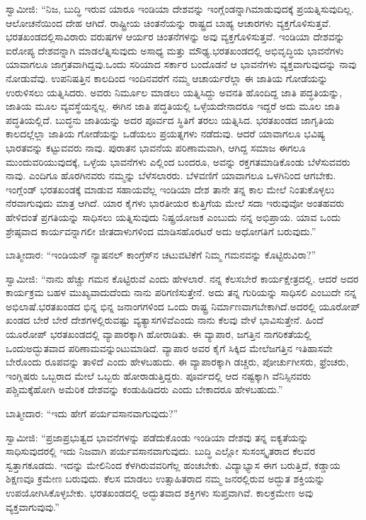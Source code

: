 ಸ್ವಾಮೀಜಿ: “ನಿಜ, ಬುದ್ಧಿ ಇರುವ ಯಾರೂ ಇಂಡಿಯಾ ದೇಶವನ್ನು ಇಂಗ್ಲೆಂಡನ್ನಾಗಿ\break ಮಾಡುವುದಕ್ಕೆ ಪ್ರಯತ್ನಿಸುವುದಿಲ್ಲ. ಆಲೋಚನೆಯಿಂದ ದೇಹ ಆಗಿದೆ. ರಾಷ್ಟ್ರೀಯ ಚಿಂತನೆಯನ್ನು ರಾಷ್ಟ್ರದ ಬಾಹ್ಯ ಆಚಾರಗಳು ವ್ಯಕ್ತಗೊಳಿಸುತ್ತವೆ. ಭರತಖಂಡದಲ್ಲಿ\break ಸಾವಿರಾರು ವರುಷಗಳ ಆರ್ಯರ ಚಿಂತನೆಗಳನ್ನು ಅವು ವ್ಯಕ್ತಗೊಳಿಸುತ್ತವೆ. ಇಂಡಿಯಾ ದೇಶವನ್ನು ಐರೋಪ್ಯ ದೇಶವನ್ನಾಗಿ ಮಾಡಲೆತ್ನಿಸುವುದು ಅಸಾಧ್ಯ ಮತ್ತು ಮೌಢ್ಯ.\break ಭರತಖಂಡದಲ್ಲಿ ಅಭಿವೃದ್ಧಿಯ ಭಾವನೆಗಳು ಯಾವಾಗಲೂ ಜಾಗ್ರತವಾಗಿದ್ದವು.\break ಒಂದು ಸರಿಯಾದ ಸರ್ಕಾರ ಬಂದೊಡನೆ ಆ ಭಾವನೆಗಳು ವ್ಯಕ್ತವಾಗುವುದನ್ನು ನಾವು ನೋಡುವೆವು. ಉಪನಿಷತ್ತಿನ ಕಾಲದಿಂದ ಇಂದಿನವರೆಗೆ ನಮ್ಮ ಆಚಾರ್ಯರೆಲ್ಲಾ ಈ ಜಾತಿಯ ಗೋಡೆಯನ್ನು ಉರುಳಿಸಲು ಯತ್ನಿಸಿದರು. ಅವರು ನಿರ್ಮೂಲ ಮಾಡಲು ಯತ್ನಿಸಿದ್ದು ಅವನತಿ ಹೊಂದಿದ್ದ ಜಾತಿ ಪದ್ಧತಿಯನ್ನು, ಜಾತಿಯ ಮೂಲ ವ್ಯವಸ್ಥೆಯನ್ನಲ್ಲ. ಈಗಿನ ಜಾತಿ ಪದ್ಧತಿಯಲ್ಲಿ ಒಳ್ಳೆಯದೇನಾದರೂ ಇದ್ದರೆ ಅದು ಮೂಲ ಜಾತಿ ಪದ್ಧತಿಯಲ್ಲಿದೆ. ಬುದ್ಧನು ಜಾತಿಯನ್ನು ಅದರ ಪೂರ್ವದ ಸ್ಥಿತಿಗೆ ತರಲು ಯತ್ನಿಸಿದ. ಭರತಖಂಡದ ಜಾಗೃತಿಯ ಕಾಲದಲ್ಲೆಲ್ಲಾ ಜಾತಿಯ ಗೋಡೆಯನ್ನು ಒಡೆಯಲು ಪ್ರಯತ್ನಗಳು ನಡೆದುವು. ಆದರೆ ಯಾವಾಗಲೂ ಭವಿಷ್ಯ ಭಾರತವನ್ನು ಕಟ್ಟುವವರು ನಾವು. ಪುರಾತನ ಭಾವನೆಯ ಪರಿಣಾಮವಾಗಿ, ಆಗಿದ್ದ ಸಮಾಜ ಈಗಲೂ ಮುಂದುವರಿಯುವುದಕ್ಕೆ, ಒಳ್ಳೆಯ ಭಾವನೆಗಳು ಎಲ್ಲಿಂದ ಬಂದರೂ, ಅವನ್ನು ರಕ್ತಗತಮಾಡಿಕೊಂಡು ಬೆಳೆಸುವವರು ನಾವು. ಎಂದಿಗೂ ಹೊರಗಿನವರು ನಮ್ಮನ್ನು ಬೆಳೆಸಲಾರರು. ಬೆಳವಣಿಗೆ ಯಾವಾಗಲೂ ಒಳಗಿನಿಂದ ಆಗಬೇಕು. ಇಂಗ್ಲೆಂಡ್​ ಭರತಖಂಡಕ್ಕೆ ಮಾಡುವ ಸಹಾಯವೆಲ್ಲ ಇಂಡಿಯಾ ದೇಶ ತಾನೇ ತನ್ನ ಕಾಲ ಮೇಲೆ ನಿಂತುಕೊಳ್ಳಲು ನೆರವಾಗುವುದು ಮಾತ್ರ ಆಗಿದೆ. ಯಾರ ಕೈಗಳು ಭಾರತೀಯರ ಕುತ್ತಿಗೆಯ ಮೇಲೆ ಸದಾ ಇರುವುವೋ ಅಂತಹವರು ಹೇಳಿದಂತೆ ಪ್ರಗತಿಯನ್ನು ಸಾಧಿಸಲು ಯತ್ನಿಸುವುದು ನಿಷ್ಪ್ರಯೋಜಕ ಎಂಬುದು ನನ್ನ ಅಭಿಪ್ರಾಯ. ಯಾವ ಒಂದು ಶ್ರೇಷ್ಠವಾದ ಕಾರ್ಯವನ್ನಾಗಲೀ ಜೀತದಾಳುಗಳಿಂದ ಮಾಡಿಸಹೊರಟರೆ ಅದು ಅಧೋಗತಿಗೆ ಬರುವುದು.”

ಬಾತ್ಮೀದಾರ: “ಇಂಡಿಯನ್​ ನ್ಯಾಷನಲ್​ ಕಾಂಗ್ರೆಸ್​ನ ಚಟುವಟಿಕೆಗೆ ನಿಮ್ಮ ಗಮನವನ್ನು ಕೊಟ್ಟಿರುವಿರಾ?”

ಸ್ವಾಮೀಜಿ: “ನಾನು ಹೆಚ್ಚು ಗಮನ ಕೊಟ್ಟಿರುವೆ ಎಂದು ಹೇಳಲಾರೆ. ನನ್ನ ಕೆಲಸ\break ಬೇರೆ ಕಾರ್ಯಕ್ಷೇತ್ರದಲ್ಲಿ. ಆದರೆ ಅದರ ಕಾರ್ಯಕ್ರಮ ಬಹಳ ಮುಖ್ಯವಾದುದೆಂದು ನಾನು ಪರಿಗಣಿಸುತ್ತೇನೆ. ಅದು ತನ್ನ ಗುರಿಯನ್ನು ಸಾಧಿಸಲಿ ಎಂಬುದೇ ನನ್ನ ಅಭಿಲಾಷೆ.\break ಭರತಖಂಡದ ಭಿನ್ನ ಭಿನ್ನ ಜನಾಂಗಗಳಿಂದ ಒಂದು ರಾಷ್ಟ್ರ ನಿರ್ಮಾಣವಾಗಬೇಕಾಗಿದೆ.\break ಅದರಲ್ಲಿ ಯೂರೋಪ್​ ಖಂಡದ ಬೇರೆ ಬೇರೆ ದೇಶಗಳಲ್ಲಿರುವಷ್ಟು ವ್ಯತ್ಯಾಸಗಳಿವೆ\break ಎಂದು ನಾನು ಕೆಲವು ವೇಳೆ ಭಾವಿಸುತ್ತೇನೆ. ಹಿಂದೆ ಯೂರೋಪ್​ ಭರತಖಂಡದಲ್ಲಿ ವ್ಯಾಪಾರಕ್ಕಾಗಿ ಹೋರಾಡಿತು. ಈ ವ್ಯಾಪಾರ, ಜಗತ್ತಿನ ನಾಗರಿಕತೆಯಲ್ಲಿ ಒಂದು\break ಅದ್ಭುತವಾದ ಪರಿಣಾಮವನ್ನುಂಟುಮಾಡಿದೆ. ವ್ಯಾಪಾರ ಅವರ ಕೈಗೆ ಸಿಕ್ಕಿದ ಮೇಲೆ\break ಜಗತ್ತಿನ ಇತಿಹಾಸವೇ ಬೇರೊಂದು ರೂಪವನ್ನು ತಾಳಿದೆ ಎಂದು ಹೇಳಬಹುದು. ಈ ವ್ಯಾಪಾರಕ್ಕಾಗಿ ಡಚ್ಚರು, ಪೋರ್ಚುಗೀಸರು, ಫ್ರೆಂಚರು, ಇಂಗ್ಲಿಷರು ಒಬ್ಬರಾದ ಮೇಲೆ ಒಬ್ಬರು ಹೋರಾಡುತ್ತಿದ್ದರು. ಪೂರ್ವದಲ್ಲಿ ಆದ ನಷ್ಟಕ್ಕಾಗಿ ವೆನಿಸ್ಸಿನವರು ಪಶ್ಚಿಮಕ್ಕೆ\break ಹೋಗಿ ಅಮೆರಿಕ ದೇಶವನ್ನು ಕಂಡುಹಿಡಿದರು ಎಂದು ಬೇಕಾದರೂ ಹೇಳಬಹುದು.”

ಬಾತ್ಮೀದಾರ: “ಇದು ಹೇಗೆ ಪರ್ಯವಸಾನವಾಗುವುದು?”

ಸ್ವಾಮೀಜಿ: “ಪ್ರಜಾಪ್ರಭುತ್ವದ ಭಾವನೆಗಳನ್ನು ಪಡೆದುಕೊಂಡು ಇಂಡಿಯಾ ದೇಶವು ತನ್ನ ಐಕ್ಯತೆಯನ್ನು ಸಾಧಿಸುವುದರಲ್ಲಿ ಇದು ನಿಜವಾಗಿ ಪರ್ಯವಸಾನವಾಗುವುದು. ಬುದ್ಧಿ ಎಲ್ಲೋ ಸುಸಂಸ್ಕೃತರಾದ ಕೆಲವರ ಸ್ವತ್ತಾಗಕೂಡದು. ಇದನ್ನು ಮೇಲಿನಿಂದ ಕೆಳಗಿರುವವರಿ\-ಗೆಲ್ಲ ಹಂಚಬೇಕು. ವಿದ್ಯಾಭ್ಯಾಸ ಈಗ ಬರುತ್ತಿದೆ, ಕಡ್ಡಾಯ ಶಿಕ್ಷಣವೂ ಕ್ರಮೇಣ ಬರುವುದು. ಕೆಲಸ ಮಾಡಲು ಉತ್ಸಾಹಿತರಾದ ನಮ್ಮ ಜನರಲ್ಲಿರುವ ಅದ್ಭುತ ಶಕ್ತಿಯನ್ನು ಉಪಯೋಗಿಸಿಕೊಳ್ಳಬೇಕು. ಭರತಖಂಡದಲ್ಲಿ ಅದ್ಭುತವಾದ ಶಕ್ತಿಗಳು ಸುಪ್ತವಾಗಿವೆ. ಕಾಲಕ್ರಮೇಣ ಅವು ವ್ಯಕ್ತವಾಗುವುವು.”

